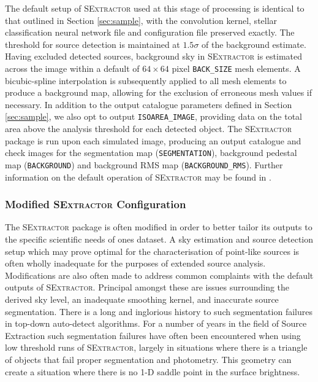 \documentclass[fleqn,usenatbib,useAMS]{mnras}
\newcommand*{\SExtractor}{\textsc{SExtractor}\xspace}
\begin{document}
The default setup of \SExtractor used at this stage of processing is identical to that outlined in Section \ref{sec:sample}, with the convolution kernel, stellar classification neural network file and configuration file preserved exactly. The threshold for source detection is maintained at $1.5\sigma$ of the background estimate. Having excluded detected sources, background sky in \SExtractor is estimated across the image within a default of $64\times64$ pixel \texttt{BACK\_SIZE} mesh elements. A bicubic-spline interpolation is subsequently applied to all mesh elements to produce a background map, allowing for the exclusion of erroneous mesh values if necessary. In addition to the output catalogue parameters defined in Section \ref{sec:sample}, we also opt to output \texttt{ISOAREA\_IMAGE}, providing data on the total area above the analysis threshold for each detected object. The \SExtractor package is run upon each simulated image, producing an output catalogue and check images for the segmentation map (\texttt{SEGMENTATION}), background pedestal map (\texttt{BACKGROUND}) and background RMS map (\texttt{BACKGROUND\_RMS}). Further information on the default operation of \SExtractor may be found in \citet{Bertin1996}.

\subsubsection{Modified \SExtractor Configuration}
\label{sec:sextractormodified}

The \SExtractor package is often modified in order to better tailor its outputs to the specific scientific needs of ones dataset. A sky estimation and source detection setup which may prove optimal for the characterisation of point-like sources is often wholly inadequate for the purposes of extended source analysis. Modifications are also often made to address common complaints with the default outputs of \SExtractor \citep[see, e.g.,][]{Haussler2007, Haussler2013, Simard2011, Barden2012, Kelvin2012, Hiemer2014}. Principal amongst these are issues surrounding the derived sky level, an inadequate smoothing kernel, and inaccurate source segmentation. There is a long and inglorious history to such segmentation failures in top-down auto-detect algorithms. For a number of years in the field of Source Extraction \citep[see e.g. \textsc{FOCAS},][]{Jarvis1981} such segmentation failures have often been encountered when using low threshold runs of \SExtractor, largely in situations where there is a triangle of objects that fail proper segmentation and photometry. This geometry can create a situation where there is no 1-D saddle point in the surface brightness.
\end{document}
